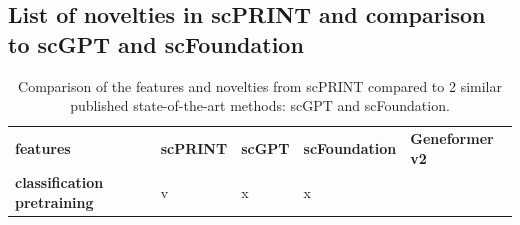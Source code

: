 \raggedbottom

\subsection{List of novelties in scPRINT and comparison to
scGPT and
scFoundation}\label{table-s1-list-of-novelties-in-scprint-and-comparison-to-scgpt-and-scfoundation}

\begin{longtable}[H]{@{}
  >{\raggedright\arraybackslash}p{}
  >{\raggedright\arraybackslash}p{}
  >{\raggedright\arraybackslash}p{}
  >{\raggedright\arraybackslash}p{}
  >{\raggedright\arraybackslash}p{}@{}}
\caption[List of novelties in scPRINT and comparison to scGPT and scFoundation]{Comparison of the features and novelties from scPRINT compared to 2 similar published state-of-the-art methods: scGPT and scFoundation.}\label{tab:s1-novelties}\\
\toprule\noalign{}
\begin{minipage}[b]{\linewidth}\centering
\textbf{features}
\end{minipage} & \begin{minipage}[b]{\linewidth}\centering
\textbf{scPRINT}
\end{minipage} & \begin{minipage}[b]{\linewidth}\centering
\textbf{scGPT}
\end{minipage} & \begin{minipage}[b]{\linewidth}\centering
\textbf{scFoundation}
\end{minipage} & \begin{minipage}[b]{\linewidth}\raggedright
\textbf{Geneformer v2}
\end{minipage} \\
\begin{minipage}[b]{\linewidth}\centering
\textbf{classification pretraining}
\end{minipage} & \begin{minipage}[b]{\linewidth}\centering
v
\end{minipage} & \begin{minipage}[b]{\linewidth}\centering
x
\end{minipage} & \begin{minipage}[b]{\linewidth}\centering
x
\end{minipage} & \begin{minipage}[b]{\linewidth}\centering

\end{minipage}
\end{longtable}
